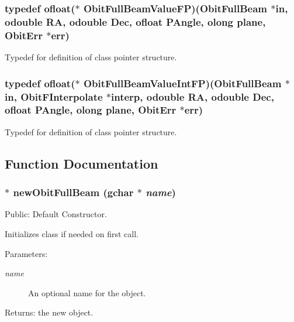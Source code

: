 \subsubsection{\setlength{\rightskip}{0pt plus 5cm}typedef {\bf ofloat}($\ast$ {\bf Obit\-Full\-Beam\-Value\-FP})({\bf Obit\-Full\-Beam} $\ast$in, {\bf odouble} RA, {\bf odouble} Dec, {\bf ofloat} PAngle, {\bf olong} plane, {\bf Obit\-Err} $\ast$err)}\label{ObitFullBeam_8h_a4}


Typedef for definition of class pointer structure. 

\subsubsection{\setlength{\rightskip}{0pt plus 5cm}typedef {\bf ofloat}($\ast$ {\bf Obit\-Full\-Beam\-Value\-Int\-FP})({\bf Obit\-Full\-Beam} $\ast$in, {\bf Obit\-FInterpolate} $\ast$interp, {\bf odouble} RA, {\bf odouble} Dec, {\bf ofloat} PAngle, {\bf olong} plane, {\bf Obit\-Err} $\ast$err)}\label{ObitFullBeam_8h_a5}


Typedef for definition of class pointer structure. 



\subsection{Function Documentation}
\subsubsection{$\ast$ new\-Obit\-Full\-Beam (gchar $\ast$ {\em name})}\label{ObitFullBeam_8h_a9}


Public: Default Constructor. 

Initializes class if needed on first call. \begin{Desc}
\item[Parameters:]
\begin{description}
\item[{\em name}]An optional name for the object. \end{description}
\end{Desc}
\begin{Desc}
\item[Returns:]the new object. \end{Desc}
